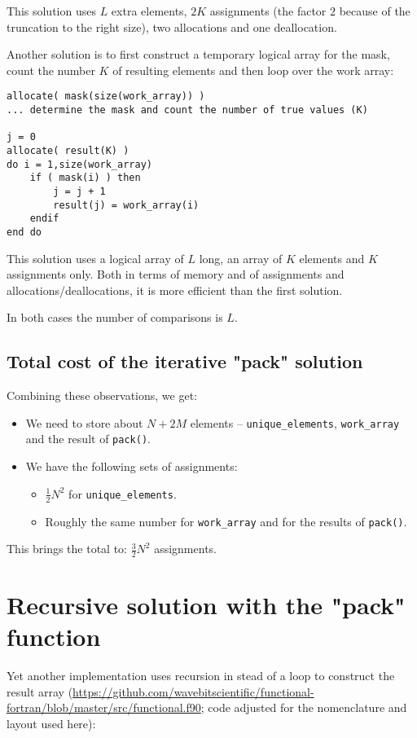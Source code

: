 \documentclass[onecolumn]{article}
\begin{document}
This solution uses $L$ extra elements, $2K$ assignments (the factor $2$ because of the
truncation to the right size), two allocations and one deallocation.

Another solution is to first construct a temporary logical array for the mask, count the number $K$ of resulting elements
and then loop over the work array:

\begin{verbatim}
allocate( mask(size(work_array)) )
... determine the mask and count the number of true values (K)

j = 0
allocate( result(K) )
do i = 1,size(work_array)
    if ( mask(i) ) then
        j = j + 1
        result(j) = work_array(i)
    endif
end do
\end{verbatim}

This solution uses a logical array of $L$ long, an array of $K$ elements and $K$ assignments only. Both in terms of memory
and of assignments and allocations/deallocations, it is more efficient than the first solution.

In both cases the number of comparisons is $L$.

\subsection*{Total cost of the iterative "pack" solution}
Combining these observations, we get:
\begin{itemize}
\item
We need to store about $N+2M$ elements -- \verb+unique_elements+, \verb+work_array+ and the result of \verb+pack()+.
\item
We have the following sets of assignments:
    \begin{itemize}
    \item
    $\frac{1}{2} N^2$ for \verb+unique_elements+.
    \item
    Roughly the same number for \verb+work_array+ and for the results of \verb+pack()+.
    \end{itemize}
\end{itemize}
This brings the total to: $\frac{3}{2} N^2$ assignments.

\section*{Recursive solution with the "pack" function}
Yet another implementation uses recursion in stead of a loop to construct the result array (\url{https://github.com/wavebitscientific/functional-fortran/blob/master/src/functional.f90};
code adjusted for the nomenclature and layout used here):
\end{document}
